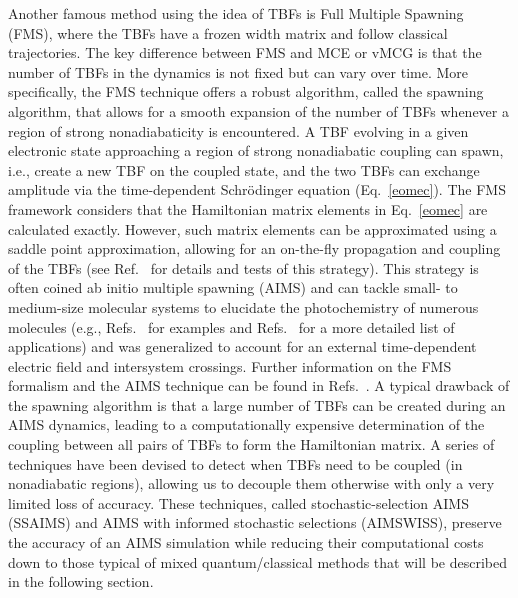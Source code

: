 \documentclass[9pt,bestpractices]{livecoms}
\begin{document}
Another famous method using the idea of TBFs is Full Multiple Spawning (FMS),\cite{martinez1996multi,martinez1997non,Ben-Nun1998,ben-nun00,hack2001comparison,toddaims,virshup2008photodynamics,curchod2018ab} where the TBFs have a frozen width matrix and follow classical trajectories. The key difference between FMS and MCE or vMCG is that the number of TBFs in the dynamics is not fixed but can vary over time. More specifically, the FMS technique offers a robust algorithm, called the spawning algorithm, that allows for a smooth expansion of the number of TBFs whenever a region of strong nonadiabaticity is encountered.\cite{yang2009optimal,levine2007isomerization,toddaims,curchod2018ab} A TBF evolving in a given electronic state approaching a region of strong nonadiabatic coupling can spawn, i.e., create a new TBF on the coupled state, and the two TBFs can exchange amplitude via the time-dependent Schr\"{o}dinger equation (Eq.~\eqref{eomec}). The FMS framework considers that the Hamiltonian matrix elements in Eq.~\eqref{eomec} are calculated exactly. However, such matrix elements can be approximated using a saddle point approximation, allowing for an on-the-fly propagation and coupling of the TBFs (see Ref.~ for details and tests of this strategy). This strategy is often coined ab initio multiple spawning (AIMS) and can tackle small- to medium-size molecular systems to elucidate the photochemistry of numerous molecules (e.g., Refs.~\cite{tao2011ultrafast,mignolet2016rich,snyder2016gpu,pijeau2017excited,li2017ultrafast,glover2018excited,yang2018imaging,coates2018vacuum} for examples and Refs.~\cite{persico2014overview,curchod2018ab} for a more detailed list of applications) and was generalized to account for an external time-dependent electric field\cite{mignolet2016communication,mignolet2019excited} and intersystem crossings.\cite{curchod2016communication,fedorov2018predicting,fedorov2016ab,varganovGAIMS2021} Further information on the FMS formalism and the AIMS technique can be found in Refs.~. A typical drawback of the spawning algorithm is that a large number of TBFs can be created during an AIMS dynamics, leading to a computationally expensive determination of the coupling between all pairs of TBFs to form the Hamiltonian matrix. A series of techniques have been devised to detect when TBFs need to be coupled (in nonadiabatic regions), allowing us to decouple them otherwise with only a very limited loss of accuracy. These techniques, called stochastic-selection AIMS (SSAIMS)\cite{curchod2020ssaims,ibele2021ssaims} and AIMS with informed stochastic selections (AIMSWISS),\cite{lassmann2021aimswiss,lassmann2022extending} preserve the accuracy of an AIMS simulation while reducing their computational costs down to those typical of mixed quantum/classical methods that will be described in the following section.   
\end{document}
